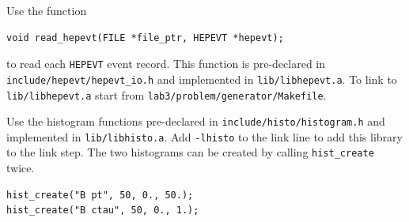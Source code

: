 \documentclass[11pt]{scrartcl}
\begin{document}
Use the function
\begin{lstlisting}
void read_hepevt(FILE *file_ptr, HEPEVT *hepevt);
\end{lstlisting}
to read each \texttt{HEPEVT} event record.
This function is pre-declared in\\ \texttt{include/hepevt/hepevt\_io.h}
and implemented in \texttt{lib/libhepevt.a}.  To link to\\
\texttt{lib/libhepevt.a} start from 
\texttt{lab3/problem/generator/Makefile}.

Use the histogram functions pre-declared in
\texttt{include/histo/histogram.h} and implemented in
\texttt{lib/libhisto.a}.  Add \texttt{-lhisto} to the link line to add
this library to the link step.  The two histograms can be created by
calling \texttt{hist\_create} twice.
\begin{lstlisting}
hist_create("B pt", 50, 0., 50.);
hist_create("B ctau", 50, 0., 1.);
\end{lstlisting}

\clearpage
\newpage




\end{document}
